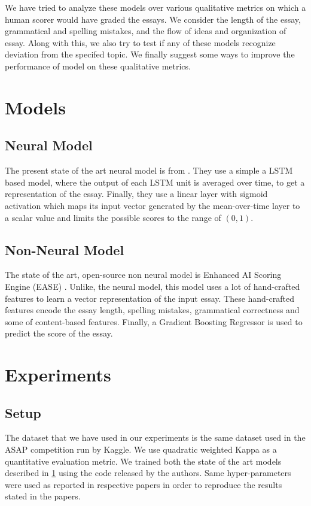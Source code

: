 \documentclass[11pt,a4paper]{article}
\begin{document}
We have tried to analyze these models over various qualitative metrics on which a human scorer would have graded the essays. We consider the length of the essay, grammatical and spelling mistakes, and the flow of ideas and organization of essay. Along with this, we also try to test if any of these models recognize deviation from the specifed topic. We finally suggest some ways to improve the performance of model on these qualitative metrics.



\section{Models}\label{sec:models}

\subsection{Neural Model}

The present state of the art neural model is from \cite{taghipour2016neural}. They use a simple a LSTM based model, where the output of each LSTM unit is averaged over time, to get a representation of the essay. Finally, they use a linear layer with sigmoid activation which maps its input vector generated by the mean-over-time layer to a scalar value and limits the possible scores to the range of $(0, 1)$.

\subsection{Non-Neural Model}

The state of the art, open-source non neural model is Enhanced AI Scoring Engine (EASE) \cite{ease}. Unlike, the neural model, this model uses a lot of hand-crafted features to learn a vector representation of the input essay. These hand-crafted features encode the essay length, spelling mistakes, grammatical correctness and some of content-based features. Finally, a Gradient Boosting Regressor is used to predict the score of the essay.


\section{Experiments}

\subsection{Setup}
The dataset that we have used in our experiments is the same dataset used in the ASAP competition run by Kaggle. We use quadratic weighted Kappa as a quantitative evaluation metric. We trained both the state of the art models described in \cref{sec:models} using the code released by the authors. Same hyper-parameters were used as reported in respective papers in order to reproduce the results stated in the papers.
\end{document}
